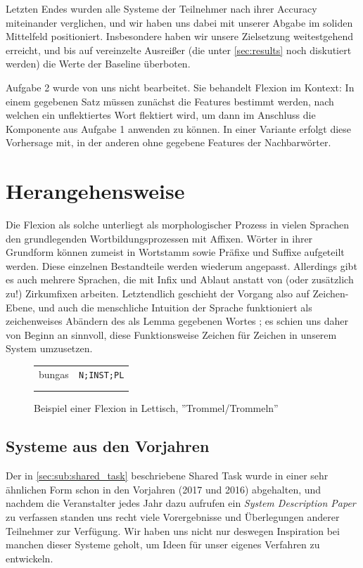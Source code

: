 \documentclass[11pt,a4paper]{article}
\begin{document}
Letzten Endes wurden alle Systeme der Teilnehmer nach ihrer Accuracy miteinander verglichen, und wir haben uns dabei mit unserer Abgabe im soliden Mittelfeld positioniert. Insbesondere haben wir unsere Zielsetzung weitestgehend erreicht, und bis auf vereinzelte Ausreißer (die unter \autoref{sec:results} noch diskutiert werden) die Werte der Baseline überboten.

Aufgabe 2 wurde von uns nicht bearbeitet. Sie behandelt Flexion im Kontext: In einem gegebenen Satz müssen zunächst die Features bestimmt werden, nach welchen ein unflektiertes Wort flektiert wird, um dann im Anschluss die Komponente aus Aufgabe 1 anwenden zu können. In einer Variante erfolgt diese Vorhersage mit, in der anderen ohne gegebene Features der Nachbarwörter.

\section{Herangehensweise}
\label{sec:approach}

Die Flexion als solche unterliegt als morphologischer Prozess in vielen Sprachen den grundlegenden Wortbildungsprozessen mit Affixen.
Wörter in ihrer Grundform können zumeist in Wortstamm sowie Präfixe und Suffixe aufgeteilt werden. Diese einzelnen Bestandteile werden wiederum angepasst.
Allerdings gibt es auch mehrere Sprachen, die mit Infix und Ablaut anstatt von (oder zusätzlich zu!) Zirkumfixen arbeiten.
\citep{inflection_seq}
Letztendlich geschieht der Vorgang also auf Zeichen-Ebene, und auch die menschliche Intuition der Sprache funktioniert als zeichenweises Abändern des als Lemma gegebenen Wortes \citep{pinker:2015:words}; es schien uns daher von Beginn an sinnvoll, diese Funktionsweise Zeichen für Zeichen in unserem System umzusetzen.

\begin{figure}[htb]
\centering
\begin{tabular}{cc}
bungas & \texttt{N;INST;PL}\\  \addlinespace
\multicolumn{2}{c}{$\Downarrow$}\\ \addlinespace
\multicolumn{2}{c}{bungām}
\end{tabular}
\caption{Beispiel einer Flexion in Lettisch, ''Trommel/Trommeln''}
\label{fig:example-inflection}
\end{figure}

\subsection{Systeme aus den Vorjahren}
Der in \autoref{sec:sub:shared_task} beschriebene Shared Task wurde in einer sehr ähnlichen Form schon in den Vorjahren (2017 und 2016) abgehalten, und nachdem die Veranstalter jedes Jahr dazu aufrufen ein \textit{System Description Paper} zu verfassen standen uns recht viele Vorergebnisse und Überlegungen anderer Teilnehmer zur Verfügung. Wir haben uns nicht nur deswegen Inspiration bei manchen dieser Systeme geholt, um Ideen für unser eigenes Verfahren zu entwickeln.
\end{document}
